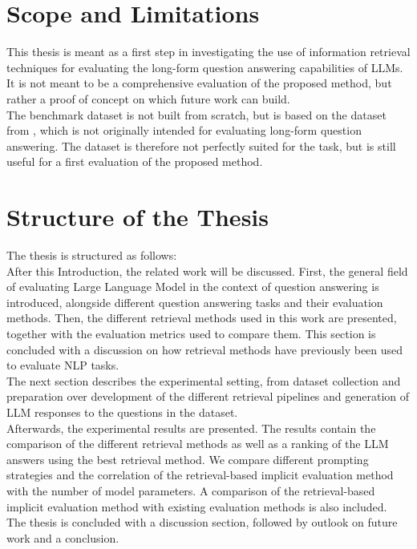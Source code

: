 \section{Scope and Limitations}\label{sec:scope-and-limitations}
This thesis is meant as a first step in investigating the use of information retrieval techniques for evaluating the long-form question answering capabilities of LLMs.
It is not meant to be a comprehensive evaluation of the proposed method, but rather a proof of concept on which future work can build.
\\
The benchmark dataset is not built from scratch, but is based on the dataset from \cite{goeuriot:2021:Consumer}, which is not originally intended for evaluating long-form question answering.
The dataset is therefore not perfectly suited for the task, but is still useful for a first evaluation of the proposed method.


\section{Structure of the Thesis}\label{sec:structure-of-the-thesis}
The thesis is structured as follows:\\
After this Introduction, the related work will be discussed.
First, the general field of evaluating Large Language Model in the context of question answering is introduced, alongside different question answering tasks and their evaluation methods.
Then, the different retrieval methods used in this work are presented, together with the evaluation metrics used to compare them.
This section is concluded with a discussion on how retrieval methods have previously been used to evaluate NLP tasks.
\\
The next section describes the experimental setting, from dataset collection and preparation over development of the different retrieval pipelines and generation of LLM responses to the questions in the dataset.
\\
Afterwards, the experimental results are presented.
The results contain the comparison of the different retrieval methods as well as a ranking of the LLM answers using the best retrieval method.
We compare different prompting strategies and the correlation of the retrieval-based implicit evaluation method with the number of model parameters.
A comparison of the retrieval-based implicit evaluation method with existing evaluation methods is also included.
\\
The thesis is concluded with a discussion section, followed by outlook on future work and a conclusion.